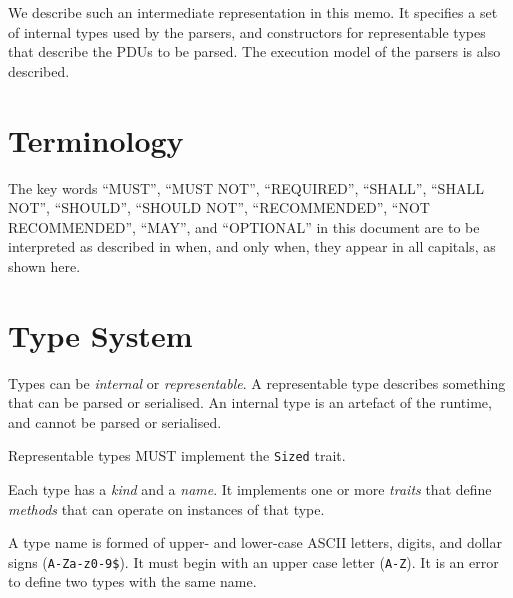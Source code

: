 \documentclass[10pt,twocolumn,a4paper]{article}
\newcommand{\code}[1]{\texttt{#1}}
\begin{document}
We describe such an intermediate representation in this memo.
It specifies a set of internal types used by the parsers, and constructors
for representable types that describe the PDUs to be parsed.
The execution model of the parsers is also described.






\section{Terminology}

The key words ``MUST'', ``MUST NOT'', ``REQUIRED'', ``SHALL'', ``SHALL
NOT'', ``SHOULD'', ``SHOULD NOT'', ``RECOMMENDED'', ``NOT RECOMMENDED'',
``MAY'', and ``OPTIONAL'' in this document are to be interpreted as
described in \cite{RFC2119,RFC8174} when, and only when, they appear
in all capitals, as shown here.

\section{Type System}

Types can be \emph{internal} or \emph{representable}. A representable type
describes something that can be parsed or serialised. An internal type is
an artefact of the runtime, and cannot be parsed or serialised.

Representable types MUST implement the \code{Sized} trait.

Each type has a \emph{kind} and a \emph{name}. It implements one or more
\emph{traits} that define \emph{methods} that can operate on instances of
that type.

A type name is formed of upper- and lower-case ASCII letters, digits, and
dollar signs (\code{A-Za-z0-9\$}). It must begin with an upper case letter
(\code{A-Z}). It is an error to define two types with the same name.
\end{document}

